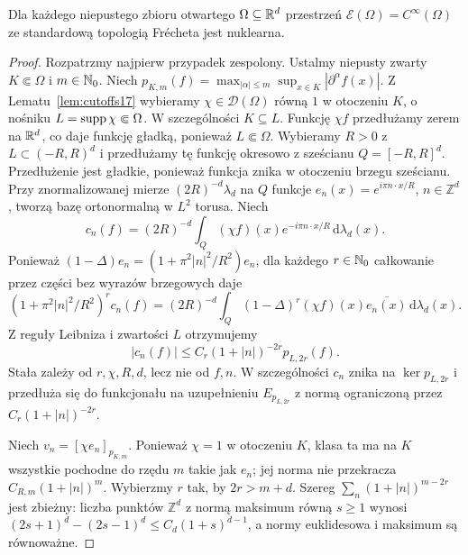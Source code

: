 \begin{twierdzenie}
\label{thm:nuclear-cinfty23}
Dla każdego niepustego zbioru otwartego $\Omega\subseteq\mathbb R^d$
przestrzeń $\mathcal E(\Omega)=C^\infty(\Omega)$
ze standardową topologią Frécheta jest nuklearna.
\end{twierdzenie}
\begin{proof}
Rozpatrzmy najpierw przypadek zespolony. Ustalmy
niepusty zwarty $K\Subset\Omega$ i $m\in\mathbb N_0$.
Niech $p_{K,m}(f)=\max_{|\alpha|\le m}\sup_{x\in K}
|\partial^\alpha f(x)|$. Z Lematu~\ref{lem:cutoffs17}
wybieramy $\chi\in\mathcal D(\Omega)$ równą $1$
w otoczeniu $K$, o nośniku $L=\operatorname{supp}\chi\Subset\Omega$.
W szczególności $K\subseteq L$. Funkcję $\chi f$
przedłużamy zerem na $\mathbb R^d$, co daje funkcję gładką,
ponieważ $L\Subset\Omega$.
Wybieramy $R>0$ z $L\subset(-R,R)^d$ i przedłużamy
tę funkcję okresowo z sześcianu $Q=[-R,R]^d$.
Przedłużenie jest gładkie, ponieważ funkcja znika
w otoczeniu brzegu sześcianu.
Przy znormalizowanej mierze $(2R)^{-d}\lambda_d$
na $Q$ funkcje $e_n(x)=e^{i\pi n\cdot x/R}$,
$n\in\mathbb Z^d$, tworzą bazę ortonormalną w $L^2$
torusa. Niech
\[
 c_n(f)=(2R)^{-d}\int_Q(\chi f)(x)
 e^{-i\pi n\cdot x/R}\,\mathrm d\lambda_d(x).
\]
Ponieważ $(1-\Delta)e_n=(1+\pi^2|n|^2/R^2)e_n$,
dla każdego $r\in\mathbb N_0$ całkowanie przez części
bez wyrazów brzegowych daje
\[
 (1+\pi^2|n|^2/R^2)^r c_n(f)
 =(2R)^{-d}\int_Q (1-\Delta)^r(\chi f)(x)
 \overline{e_n(x)}\,\mathrm d\lambda_d(x).
\]
Z reguły Leibniza i zwartości $L$ otrzymujemy
\[
 |c_n(f)|\le C_r(1+|n|)^{-2r}p_{L,2r}(f).
\]
Stała zależy od $r,\chi,R,d$, lecz nie od $f,n$.
W szczególności $c_n$ znika na $\ker p_{L,2r}$
i przedłuża się do funkcjonału na uzupełnieniu
$E_{p_{L,2r}}$ z normą ograniczoną przez
$C_r(1+|n|)^{-2r}$.

Niech $v_n=[\chi e_n]_{p_{K,m}}$.
Ponieważ $\chi=1$ w otoczeniu $K$, klasa ta ma
na $K$ wszystkie pochodne do rzędu $m$ takie jak $e_n$;
jej norma nie przekracza $C_{R,m}(1+|n|)^m$.
Wybierzmy $r$ tak, by $2r>m+d$.
Szereg $\sum_n (1+|n|)^{m-2r}$ jest zbieżny:
liczba punktów $\mathbb Z^d$ z normą maksimum równą
$s\ge1$ wynosi $(2s+1)^d-(2s-1)^d
\le C_d(1+s)^{d-1}$, a normy euklidesowa i maksimum
są równoważne.


\end{proof}
